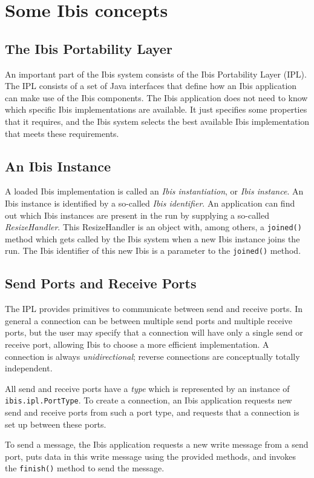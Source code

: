 \documentclass[10pt]{article}
\newcommand{\mysection}[1]{\section{#1}\label{#1}}
\newcommand{\mysubsection}[1]{\subsection{#1}\label{#1}}
\begin{document}
\mysection{Some Ibis concepts}

\mysubsection{The Ibis Portability Layer}

An important part of the Ibis system consists of the Ibis Portability Layer (IPL).
The IPL consists of a set of Java interfaces that define how an Ibis application
can make use of the Ibis components.
The Ibis application does not need to know which specific Ibis implementations are
available.
It just specifies some properties that it requires, and the Ibis system
selects the best available Ibis implementation that meets these requirements.
 
\mysubsection{An Ibis Instance}

A loaded Ibis implementation is called an \emph{Ibis instantiation}, or 
\emph{Ibis instance}.
An Ibis instance is identified by a so-called
\emph{Ibis identifier}.
An application can find out which Ibis instances are present in the run
by supplying a so-called \emph{ResizeHandler}.
This ResizeHandler is an object with, among others, a \texttt{joined()}
method which gets called by the Ibis system when a new Ibis instance
joins the run.  The Ibis identifier of this new Ibis is a parameter
to the \texttt{joined()} method.

\mysubsection{Send Ports and Receive Ports}

The IPL provides primitives to communicate between send and receive ports.
In general a connection can be between multiple send ports and multiple
receive ports, but the user may specify that a connection will have only
a single send or receive port, allowing Ibis to choose a more efficient
implementation.  A connection is always \emph{unidirectional}; reverse
connections are conceptually totally independent.

All send and receive ports have a \emph{type} which is represented by an
instance of \texttt{ibis.ipl.PortType}.
To create a connection, an Ibis application requests new send and receive
ports from such a port type, and requests that a connection is set up 
between these ports.

To send a message, the Ibis application requests a new write message from
a send port, puts data in this write message using the provided methods,
and invokes the \texttt{finish()} method to send the message.
\end{document}
